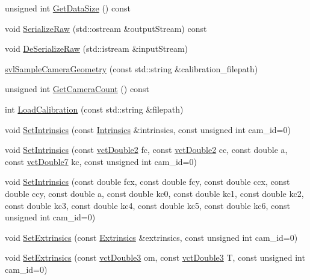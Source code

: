 \begin{DoxyCompactItemize}
\item 
unsigned int \hyperlink{classsvl_sample_camera_geometry_a4255f71f2a1c2068f0781075c73b3a1c}{Get\-Data\-Size} () const 
\item 
void \hyperlink{classsvl_sample_camera_geometry_ab9fab60b3c61042532b4818022321c2f}{Serialize\-Raw} (std\-::ostream \&output\-Stream) const 
\item 
void \hyperlink{classsvl_sample_camera_geometry_a18e5668507b1836a75f180a79c0fda3a}{De\-Serialize\-Raw} (std\-::istream \&input\-Stream)
\item 
\hyperlink{classsvl_sample_camera_geometry_a5577cd124727bfb6306a5c66a589b921}{svl\-Sample\-Camera\-Geometry} (const std\-::string \&calibration\-\_\-filepath)
\item 
unsigned int \hyperlink{classsvl_sample_camera_geometry_abf0ecec96daa5725aadb14396eaf071c}{Get\-Camera\-Count} () const 
\item 
int \hyperlink{classsvl_sample_camera_geometry_a18081b03a7bbb4f21181da0cdd4e610d}{Load\-Calibration} (const std\-::string \&filepath)
\item 
void \hyperlink{classsvl_sample_camera_geometry_a7ca3c9b9a41c91371b8b1b1b224e655e}{Set\-Intrinsics} (const \hyperlink{structsvl_sample_camera_geometry_1_1_intrinsics}{Intrinsics} \&intrinsics, const unsigned int cam\-\_\-id=0)
\item 
void \hyperlink{classsvl_sample_camera_geometry_adc5e18eef19cb2bebd85c61ca62f1652}{Set\-Intrinsics} (const \hyperlink{vct_fixed_size_vector_types_8h_afc0fdcc41cbe8b043747612501610812}{vct\-Double2} fc, const \hyperlink{vct_fixed_size_vector_types_8h_afc0fdcc41cbe8b043747612501610812}{vct\-Double2} cc, const double a, const \hyperlink{vct_fixed_size_vector_types_8h_a600a52ac438879e14dd78db8002d2681}{vct\-Double7} kc, const unsigned int cam\-\_\-id=0)
\item 
void \hyperlink{classsvl_sample_camera_geometry_a47cf52390725803f085786c2fc3780f6}{Set\-Intrinsics} (const double fcx, const double fcy, const double ccx, const double ccy, const double a, const double kc0, const double kc1, const double kc2, const double kc3, const double kc4, const double kc5, const double kc6, const unsigned int cam\-\_\-id=0)
\item 
void \hyperlink{classsvl_sample_camera_geometry_ad5990f89b0b86ba5c7bdcb1c7b7c8802}{Set\-Extrinsics} (const \hyperlink{structsvl_sample_camera_geometry_1_1_extrinsics}{Extrinsics} \&extrinsics, const unsigned int cam\-\_\-id=0)
\item 
void \hyperlink{classsvl_sample_camera_geometry_a16f3e94ec626159f66af0c1e67cb9d0b}{Set\-Extrinsics} (const \hyperlink{vct_fixed_size_vector_types_8h_a4a89122c9d7f72c3f31fe8126e17c3af}{vct\-Double3} om, const \hyperlink{vct_fixed_size_vector_types_8h_a4a89122c9d7f72c3f31fe8126e17c3af}{vct\-Double3} T, const unsigned int cam\-\_\-id=0)

\end{DoxyCompactItemize}
